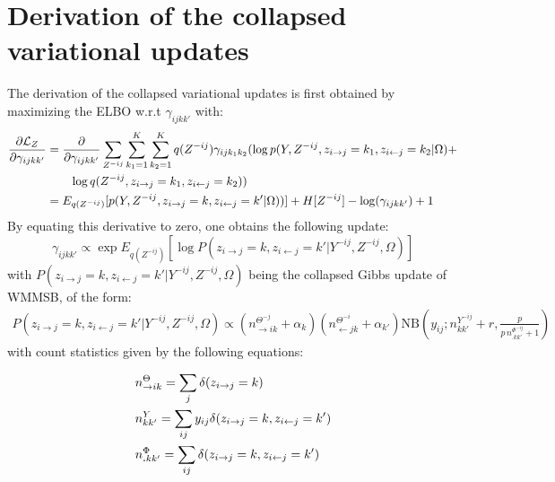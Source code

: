 \section{Derivation of the collapsed variational updates}

The derivation of the collapsed variational updates is first obtained by maximizing the ELBO w.r.t $\gamma_{ijkk'}$ with:
%
\begin{align*}
\frac{\partial \mathcal{L}_Z}{\partial \gamma_{ijkk'}} &= \frac{\partial }{\partial \gamma_{ijkk'}}  \sum_{Z^{-ij}}\sum_{k_1=1}^K\sum_{k_2=1}^K  q(Z^{-ij}) \gamma_{ijk_1 k_2} (\log p(Y, Z^{-ij}, z_{i\rightarrow j}=k_1, z_{i\leftarrow j}=k_2|\Omega)+ \\
& \qquad \log q(Z^{-ij}, z_{i\rightarrow j}=k_1, z_{i\leftarrow j}=k_2) )   \\
&= E_{q(Z^{-ij})}[ p(Y, Z^{-ij}, z_{i\rightarrow j}=k, z_{i\leftarrow j}=k'|\Omega))] + H[Z^{-ij}] -\log(\gamma_{ijkk'}) +1
\end{align*}
%
By equating this derivative to zero, one obtains the following update:
\begin{equation} \label{eq1}
\gamma_{ijkk'} \propto \exp E_{q(Z^{-ij})} [\log P(z_{i\rightarrow j}=k, z_{i\leftarrow j}=k' | Y^{-ij}, Z^{-ij}, \Omega) ]
\end{equation}
%
with  $P(z_{i\rightarrow j}=k, z_{i\leftarrow j}=k' | Y^{-ij}, Z^{-ij}, \Omega)$ being the collapsed Gibbs update of WMMSB, of the form:
%
\begin{align*}
P(z_{i\rightarrow j}=k, z_{i\leftarrow j}=k' |Y^{-ij}, Z^{-ij}, \Omega) \propto (n_{\rightarrow ik}^{\Theta^{-j}} + \alpha_k) (n_{\leftarrow jk}^{\Theta^{-i}} + \alpha_{k'}) \mathrm{NB}\left(y_{ij}; n^{Y^{-ij}}_{kk'} + r, \frac{p}{p\,n^{\Phi^{-ij}}_{\bm{.}kk'} + 1} \right)
\end{align*}
%
with count statistics given by the following equations:


\begin{align*}                                                                                                                                        
&n^{\Theta}_{\rightarrow ik} = \sum_j \delta(z_{i\rightarrow j}=k)\\
&n^{Y}_{kk'} = \sum_{ij} y_{ij}\delta(z_{i\rightarrow j}=k, z_{i\leftarrow j}=k') \\
&n^{\Phi}_{\bm{.}kk'} = \sum_{ij} \delta( z_{i\rightarrow j}=k, z_{i\leftarrow j}=k') 
\end{align*}   

